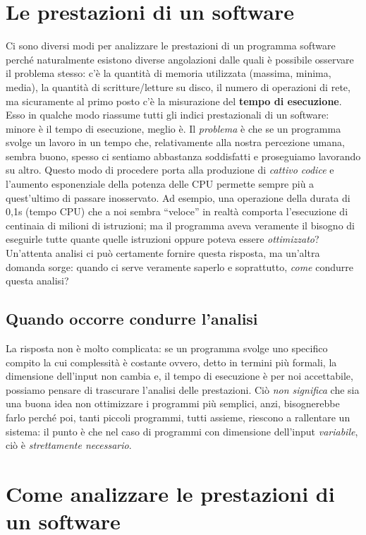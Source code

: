 \documentclass[a4paper,11pt]{report}
\begin{document}
\section{Le prestazioni di un software}

Ci sono diversi modi per analizzare le prestazioni di un programma software perché naturalmente
esistono diverse angolazioni dalle quali è possibile osservare il problema stesso: 
c'è la quantità di memoria utilizzata (massima, minima, media), la quantità 
di scritture/letture su disco, il numero di operazioni di rete, ma sicuramente
al primo posto c'è la misurazione del \textbf{tempo di esecuzione}. 
Esso in qualche modo riassume tutti gli indici prestazionali di un software: 
minore è il tempo di esecuzione, meglio è.
Il \textit{problema} è che se un programma svolge un lavoro in un tempo che, relativamente alla nostra percezione umana, sembra buono, spesso ci sentiamo abbastanza soddisfatti e proseguiamo lavorando su altro.
Questo modo di procedere porta alla produzione di \textit{cattivo codice} e l'aumento esponenziale della potenza delle CPU permette sempre più a quest'ultimo di passare 
inosservato. Ad esempio, una operazione della durata di 0,1s (tempo CPU) che a noi sembra ``veloce'' 
in realtà comporta l'esecuzione di centinaia di milioni di istruzioni; ma il programma aveva 
veramente il bisogno di eseguirle tutte quante quelle istruzioni oppure poteva essere \textit{ottimizzato}? Un'attenta analisi ci può certamente fornire questa risposta, ma un'altra domanda sorge: quando ci serve veramente saperlo e soprattutto, \textit{come} condurre questa analisi?  

\subsection{Quando occorre condurre l'analisi}

La risposta non è molto complicata: se un programma svolge uno specifico compito la cui complessità è costante ovvero, detto in termini più formali, la dimensione dell'input non cambia e, il tempo di esecuzione è per noi accettabile, possiamo pensare di trascurare l'analisi delle prestazioni.
Ciò \textit{non significa} che sia una buona idea non ottimizzare i programmi più semplici, anzi, bisognerebbe farlo perché poi, tanti piccoli programmi, tutti assieme, riescono a rallentare un sistema: il punto è che nel caso di programmi con dimensione dell'input \textit{variabile}, ciò è \textit{strettamente necessario}.

\section{Come analizzare le prestazioni di un software}
\end{document}
